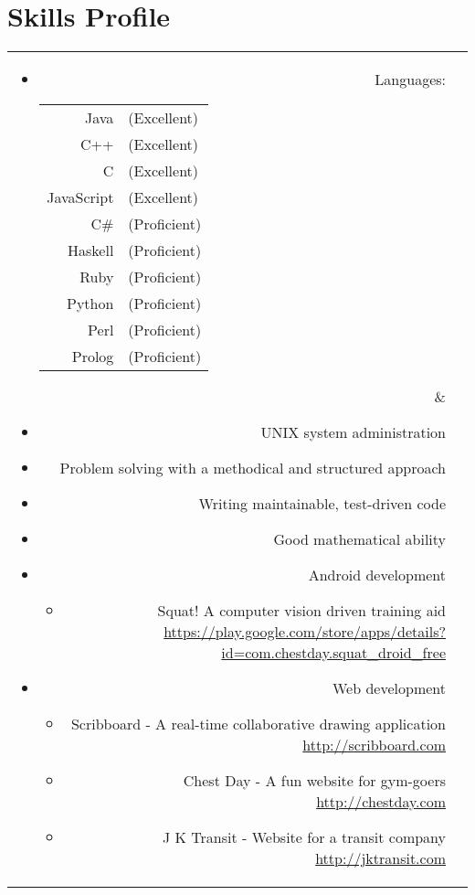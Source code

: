 \section*{Skills Profile}

\begin{tabular}{rl}

\parbox[t]{0.3\textwidth}{
	\begin{itemize}
		\item Languages:
		\begin{tabular}[h]{rl}
			Java & (Excellent)\\
			C++ & (Excellent)\\
			C & (Excellent)\\
			JavaScript & (Excellent)\\
			C\# & (Proficient)\\
			Haskell & (Proficient)\\
			Ruby & (Proficient)\\
			Python & (Proficient)\\
			Perl & (Proficient)\\
			Prolog & (Proficient)
		\end{tabular}
	\end{itemize}}
&
\parbox[t]{0.6\textwidth}{
	\begin{itemize}
		\item UNIX system administration
		\item Problem solving with a methodical and structured approach
		\item Writing maintainable, test-driven code
		\item Good mathematical ability
		\item Android development
			\begin{itemize}
				\item Squat! A computer vision driven training aid\\
				\url{https://play.google.com/store/apps/details?id=com.chestday.squat_droid_free}
			\end{itemize}
		\item Web development
			\begin{itemize}
				\item Scribboard - A real-time collaborative drawing application\\
				\url{http://scribboard.com}
				\item Chest Day - A fun website for gym-goers\\
				\url{http://chestday.com}
				\item J K Transit - Website for a transit company\\
				\url{http://jktransit.com}
			\end{itemize}
	\end{itemize}}\\

\end{tabular}